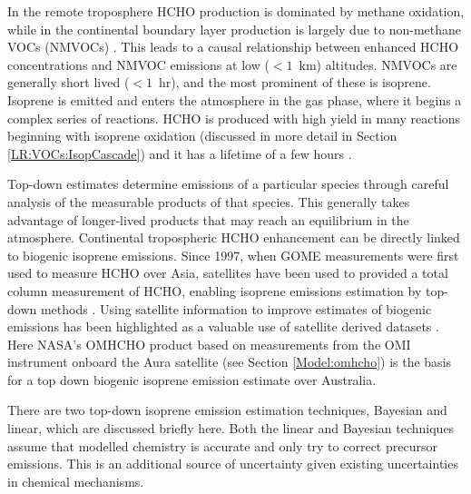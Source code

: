     In the remote troposphere HCHO production is dominated by methane oxidation, while in the continental boundary layer production is largely due to non-methane VOCs (NMVOCs) \parencite{Abbot2003, Kefauver2014}.
    This leads to a causal relationship between enhanced HCHO concentrations and NMVOC emissions at low ($<1$~km) altitudes.
    NMVOCs are generally short lived ($<1$~hr), and the most prominent of these is isoprene.
    Isoprene is emitted and enters the atmosphere in the gas phase, where it begins a complex series of reactions.
    HCHO is produced with high yield in many reactions beginning with isoprene oxidation (discussed in more detail in Section \ref{LR:VOCs:IsopCascade}) and it has a lifetime of a few hours \parencite{Kefauver2014}.
    
    Top-down estimates determine emissions of a particular species through careful analysis of the measurable products of that species.
    This generally takes advantage of longer-lived products that may reach an equilibrium in the atmosphere.
    Continental tropospheric HCHO enhancement can be directly linked to biogenic isoprene emissions.
    Since 1997, when GOME measurements were first used to measure HCHO over Asia, satellites have been used to provided a total column measurement of HCHO, enabling isoprene emissions estimation by top-down methods \parencite{Thomas1998,Palmer2001,Bauwens2016}.
    Using satellite information to improve estimates of biogenic emissions has been highlighted as a valuable use of satellite derived datasets \parencite{Streets2013}.
    Here NASA's OMHCHO product based on measurements from the OMI instrument onboard the Aura satellite (see Section \ref{Model:omhcho}) is the basis for a top down biogenic isoprene emission estimate over Australia.
    
    There are two top-down isoprene emission estimation techniques, Bayesian and linear, which are discussed briefly here.
    Both the linear and Bayesian techniques assume that modelled chemistry is accurate and only try to correct precursor emissions.
    This is an additional source of uncertainty given existing uncertainties in chemical mechanisms.
    
